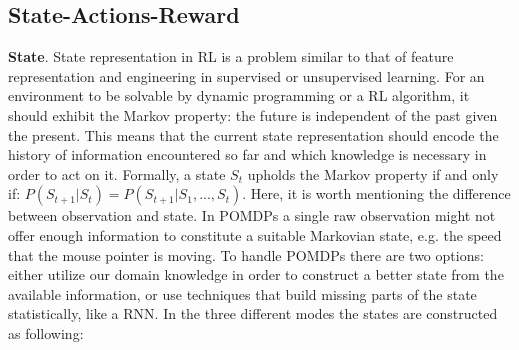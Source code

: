 
\subsection{State-Actions-Reward}
\textbf{State}. State representation in \gls{RL} is a problem similar to that of feature representation and engineering in supervised or unsupervised learning.
For an environment to be solvable by dynamic programming or a \gls{RL} algorithm, it should exhibit the Markov property: the future is independent of the past given the present.
This means that the current state representation should encode the history of information encountered so far and which knowledge is necessary in order to act on it.
Formally, a state $S_t$ upholds the Markov property if and only if: $P(S_{t+1} | S_t) = P(S_{t+1} | S_1,..., S_t)$.
Here, it is worth mentioning the difference between observation and state.
In POMDPs a single raw observation might not offer enough information to constitute a suitable Markovian state, e.g. the speed that the mouse pointer is moving.
To handle POMDPs there are two options: either utilize our domain knowledge in order to construct a better state from the available information, or use techniques that build missing parts of the state statistically, like a \gls{RNN}.
In the three different modes the states are constructed as following:

